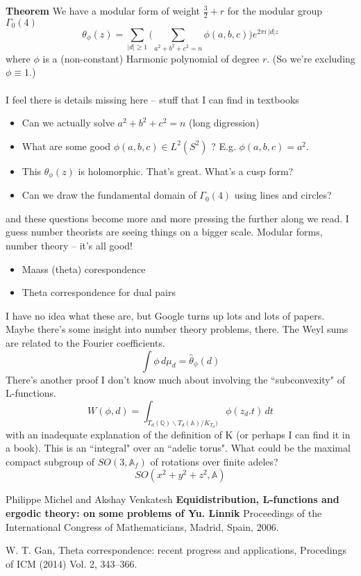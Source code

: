 \documentclass[12pt]{article}
\begin{document}
\newpage

\noindent \textbf{Theorem} We have a modular form of weight $\frac{3}{2} + r$ for the modular group $\Gamma_0(4)$
$$ \theta_\phi(z) = \sum_{|d|\geq 1} \bigg( \sum_{a^2 + b^2 + c^2 = n}\phi(a,b,c) \bigg)e^{2\pi i \, |d|z} $$ 
where $\phi$ is a (non-constant) Harmonic polynomial of degree $r$.  (So we're excluding $\phi \equiv 1$.) \\ \\
I feel there is details missing here -- stuff that I can find in textbooks
\begin{itemize}
\item Can we actually solve $a^2 + b^2 + c^2 = n$ (long digression)
\item What are some good $\phi(a,b,c) \in L^2(S^2)$ ? E.g. $\phi(a,b,c) = a^2$.
\item This $\theta_\phi(z)$ is holomorphic.  That's great.  What's a cusp form?
\item Can we draw the fundamental domain of $\Gamma_0(4)$ using lines and circles?
\end{itemize}
and these questions become more and more pressing the further along we read. I guess number theorists are seeing things on a bigger scale.  Modular forms, number theory -- it's all good!  
\begin{itemize}
\item Maass (theta) corespondence
\item Theta correspondence for dual pairs
\end{itemize}
I have no idea what these are, but Google turns up lots and lots of papers.  Maybe there's some insight into number theory problems, there.   The Weyl sums are related to the Fourier coefficients.
$$ \int \phi \,  d\mu_d =  \widehat{\theta}_\phi(d) $$
There's another proof I don't know much about involving the ``subconvexity" of L-functions.
$$ W(\phi, d) = \int_{T_d(\mathbb{Q}) \backslash T_d(\mathbb{A})/K_{T_d} \big)} \phi( z_d . t) \, dt $$
with an inadequate explanation of the definition of K (or perhaps I can find it in a book).  This is an ``integral" over an ``adelic torus".  What could be the maximal compact subgroup of $SO(3, \mathbb{A}_f)$ of rotations over finite adeles?
$$  SO( x^2 + y^2 + z^2, \mathbb{A}) $$

\newpage

\selectfont \fontsize{12}{10}\selectfont

\begin{thebibliography}{}

\item Philippe Michel and Akshay Venkatesh \textbf{Equidistribution, L-functions and ergodic theory: on some problems of Yu. Linnik} Proceedings of the International Congress
of Mathematicians, Madrid, Spain, 2006.

\item  W. T. Gan, Theta correspondence: recent progress and applications, Procedings of
ICM (2014) Vol. 2, 343–366.

\end{thebibliography}
\end{document}
